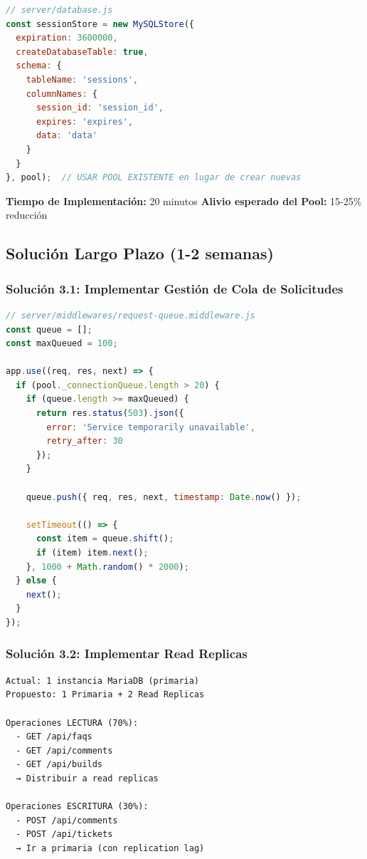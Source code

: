 \documentclass[12pt,a4paper]{article}
\begin{document}
\begin{lstlisting}[language=JavaScript, caption=Session store usando pool existente]
// server/database.js
const sessionStore = new MySQLStore({
  expiration: 3600000,
  createDatabaseTable: true,
  schema: {
    tableName: 'sessions',
    columnNames: {
      session_id: 'session_id',
      expires: 'expires',
      data: 'data'
    }
  }
}, pool);  // USAR POOL EXISTENTE en lugar de crear nuevas
\end{lstlisting}

\textbf{Tiempo de Implementación:} 20 minutos  
\textbf{Alivio esperado del Pool:} 15-25\% reducción

\subsection{Solución Largo Plazo (1-2 semanas)}

\subsubsection{Solución 3.1: Implementar Gestión de Cola de Solicitudes}

\begin{lstlisting}[language=JavaScript, caption=Request queue management]
// server/middlewares/request-queue.middleware.js
const queue = [];
const maxQueued = 100;

app.use((req, res, next) => {
  if (pool._connectionQueue.length > 20) {
    if (queue.length >= maxQueued) {
      return res.status(503).json({ 
        error: 'Service temporarily unavailable',
        retry_after: 30 
      });
    }
    
    queue.push({ req, res, next, timestamp: Date.now() });
    
    setTimeout(() => {
      const item = queue.shift();
      if (item) item.next();
    }, 1000 + Math.random() * 2000);
  } else {
    next();
  }
});
\end{lstlisting}

\subsubsection{Solución 3.2: Implementar Read Replicas}

\begin{lstlisting}[language=text]
Actual: 1 instancia MariaDB (primaria)
Propuesto: 1 Primaria + 2 Read Replicas

Operaciones LECTURA (70%):
  - GET /api/faqs
  - GET /api/comments
  - GET /api/builds
  → Distribuir a read replicas

Operaciones ESCRITURA (30%):
  - POST /api/comments
  - POST /api/tickets
  → Ir a primaria (con replication lag)
\end{lstlisting}
\end{document}
